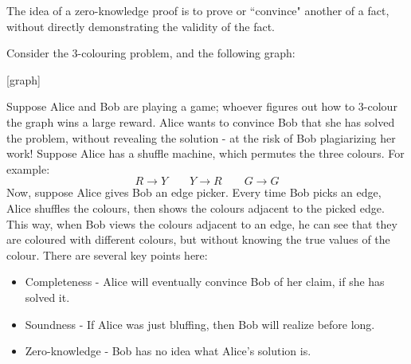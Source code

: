\documentclass{article}
\begin{document}
The idea of a zero-knowledge proof is to prove or ``convince" another of a fact,
without directly demonstrating the validity of the fact.

\begin{xmp}[source=Primary Source Material]
    Consider the 3-colouring problem, and the following graph:

    [graph]

    Suppose Alice and Bob are playing a game; whoever figures out how to 3-colour the graph
    wins a large reward. Alice wants to convince Bob that she has solved the problem, without
    revealing the solution - at the risk of Bob plagiarizing her work! \vsp
    Suppose Alice has a shuffle machine, which permutes the three colours.
    For example:
    \begin{equation*}
        R \rightarrow Y \qquad Y \rightarrow R \qquad G \rightarrow G
    \end{equation*}
    Now, suppose Alice gives Bob an edge picker.
    Every time Bob picks an edge, Alice shuffles the colours,
    then shows the colours adjacent to the picked edge.
    This way, when Bob views the colours adjacent to an edge, he can see that they are
    coloured with different colours, but without knowing the true values of the colour. \vsp
    There are several key points here:
    \begin{itemize}
        \item Completeness - Alice will eventually convince Bob of her claim, if she has solved it.
        \item Soundness - If Alice was just bluffing, then Bob will realize before long.
        \item Zero-knowledge - Bob has no idea what Alice's solution is.
    \end{itemize}
\end{xmp}
\end{document}
